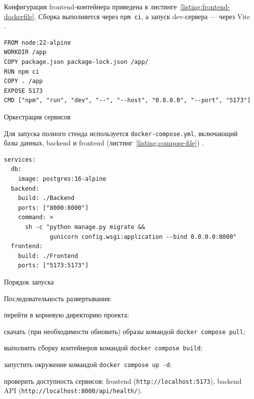 Конфигурация frontend-контейнера приведена в листинге~\ref{listing:frontend-dockerfile}. Сборка выполняется через \texttt{npm ci}, а запуск dev-сервера --- через Vite \cite{npm_docs_2026,vite_docs_2026,vite_deploy_docs_2026}.

\begin{listing}[H]
\caption{Dockerfile клиентской части}
\label{listing:frontend-dockerfile}
\begin{mdframed}
\begin{verbatim}
FROM node:22-alpine
WORKDIR /app
COPY package.json package-lock.json /app/
RUN npm ci
COPY . /app
EXPOSE 5173
CMD ["npm", "run", "dev", "--", "--host", "0.0.0.0", "--port", "5173"]
\end{verbatim}
\end{mdframed}
\end{listing}

Оркестрация сервисов

Для запуска полного стенда используется \texttt{docker-compose.yml}, включающий базы данных, backend и frontend (листинг~\ref{listing:compose-file}) \cite{docker_compose_docs_2026}.

\begin{listing}[H]
\caption{Фрагмент docker-compose.yml}
\label{listing:compose-file}
\begin{mdframed}
\begin{verbatim}
services:
  db:
    image: postgres:16-alpine
  backend:
    build: ./Backend
    ports: ["8000:8000"]
    command: >
      sh -c "python manage.py migrate &&
             gunicorn config.wsgi:application --bind 0.0.0.0:8000"
  frontend:
    build: ./Frontend
    ports: ["5173:5173"]
\end{verbatim}
\end{mdframed}
\end{listing}

Порядок запуска

Последовательность развертывания:
\begin{compactlist}
  \item перейти в корневую директорию проекта;
  \item скачать (при необходимости обновить) образы командой \texttt{docker compose pull};
  \item выполнить сборку контейнеров командой \texttt{docker compose build};
  \item запустить окружение командой \texttt{docker compose up -d};
  \item проверить доступность сервисов: frontend (\texttt{http://localhost:5173}), backend API (\texttt{http://localhost:8000/api/health/}).
\end{compactlist}

